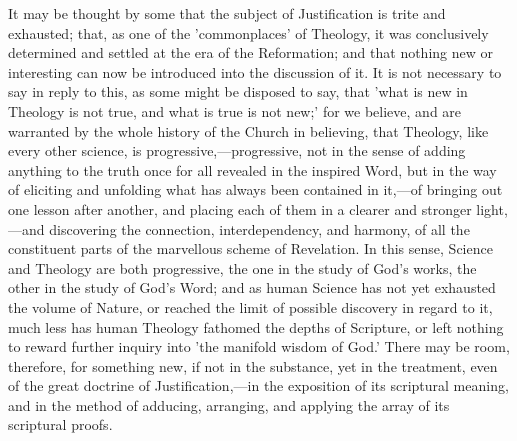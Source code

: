 \documentclass[
]{book}
\begin{document}
It may be thought by some that the subject of Justification is trite and exhausted; that, as one of the 'commonplaces' of Theology, it was conclusively determined and settled at the era of the Reformation; and that nothing new or interesting can now be introduced into the discussion of it. It is not necessary to say in reply to this, as some might be disposed to say, that 'what is new in Theology is not true, and what is true is not new;' for we believe, and are warranted by the whole history of the Church in believing, that Theology, like every other science, is progressive,---progressive, not in the sense of adding anything to the truth once for all revealed in the inspired Word, but in the way of eliciting and unfolding what has always been contained in it,---of bringing out one lesson after another, and placing each of them in a clearer and stronger light,---and discovering the connection, interdependency, and harmony, of all the constituent parts of the marvellous scheme of Revelation. In this sense, Science and Theology are both progressive, the one in the study of God's works, the other in the study of God's Word; and as human Science has not yet exhausted the volume of Nature, or reached the limit of possible discovery in regard to it, much less has human Theology fathomed the depths of Scripture, or left nothing to reward further inquiry into 'the manifold wisdom of God.' There may be room, therefore, for something new, if not in the substance, yet in the treatment, even of the great doctrine of Justification,---in the exposition of its scriptural meaning, and in the method of adducing, arranging, and applying the array of its scriptural proofs.
\end{document}

